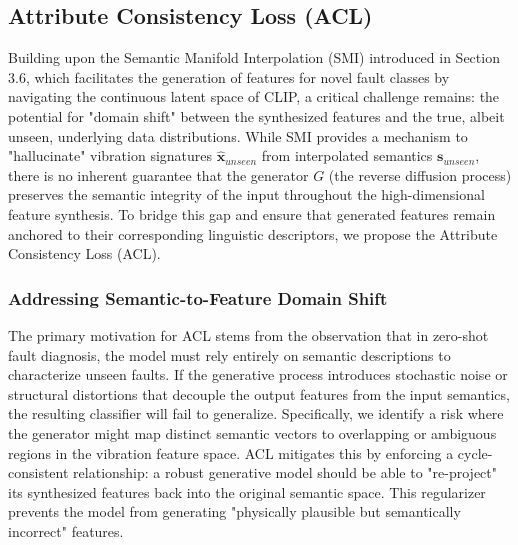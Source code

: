 \subsection{Attribute Consistency Loss (ACL)}

Building upon the Semantic Manifold Interpolation (SMI) introduced in Section 3.6, which facilitates the generation of features for novel fault classes by navigating the continuous latent space of CLIP, a critical challenge remains: the potential for "domain shift" between the synthesized features and the true, albeit unseen, underlying data distributions. While SMI provides a mechanism to "hallucinate" vibration signatures $\hat{\mathbf{x}}_{unseen}$ from interpolated semantics $\mathbf{s}_{unseen}$, there is no inherent guarantee that the generator $G$ (the reverse diffusion process) preserves the semantic integrity of the input throughout the high-dimensional feature synthesis. To bridge this gap and ensure that generated features remain anchored to their corresponding linguistic descriptors, we propose the Attribute Consistency Loss (ACL).

\subsubsection{Addressing Semantic-to-Feature Domain Shift}
The primary motivation for ACL stems from the observation that in zero-shot fault diagnosis, the model must rely entirely on semantic descriptions to characterize unseen faults. If the generative process introduces stochastic noise or structural distortions that decouple the output features from the input semantics, the resulting classifier will fail to generalize. Specifically, we identify a risk where the generator might map distinct semantic vectors to overlapping or ambiguous regions in the vibration feature space. ACL mitigates this by enforcing a cycle-consistent relationship: a robust generative model should be able to "re-project" its synthesized features back into the original semantic space. This regularizer prevents the model from generating "physically plausible but semantically incorrect" features.

